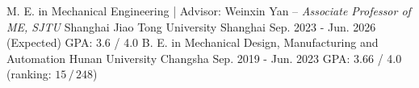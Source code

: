 \begin{cventries}
    \vspace{-0.5mm}
	\cventry
	{M. E. in Mechanical Engineering | Advisor: Weinxin Yan -- \textit{Associate Professor of ME, SJTU}} %
	{Shanghai Jiao Tong University} %
	{Shanghai} %
	{Sep. 2023 - Jun. 2026 (Expected)} %
	{
        GPA: 3.6 / 4.0
	}%
	\vspace{3mm} 
	\cventry
	{B. E. in Mechanical Design, Manufacturing and Automation} %
	{Hunan University} %
	{Changsha} %
	{Sep. 2019 - Jun. 2023} %
	{
        GPA: 3.66 / 4.0 (ranking: $15 \, / \, 248$)
	}%
    \vspace{5.5mm}
\end{cventries}
